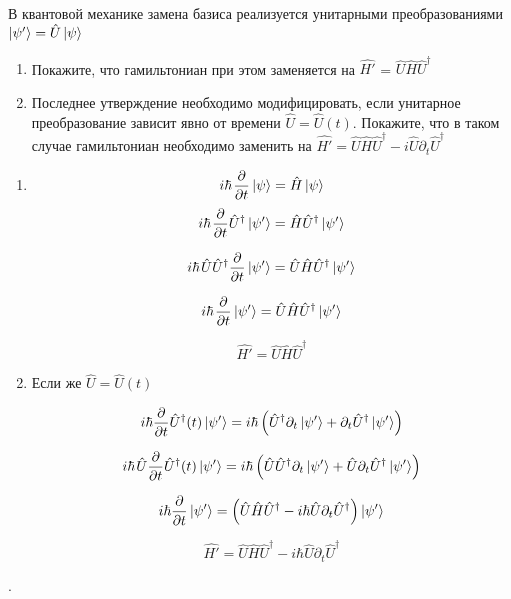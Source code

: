 \begin{exercise}
	В квантовой механике замена базиса реализуется унитарными преобразованиями $\ket{\psi'} = \hat{U}\ket{\psi}$

	\begin{enumerate}
		\item
		Покажите, что гамильтониан при этом заменяется на $\hat{H'}$ = $\hat{U}$$\hat{H}$$\hat{U}^\dagger$
		\item 
		Последнее утверждение необходимо модифицировать, если унитарное преобразование зависит явно от времени $\hat{U}=\hat{U}(t)$. Покажите, что в таком случае гамильтониан необходимо заменить на $\hat{H'} = \hat{U}\hat{H}\hat{U}^\dagger  - i\hat{U} \partial_t \hat{U}^\dagger$
	\end{enumerate}

	\begin{solution}
		\begin{enumerate}
			\item
		
		$$
		i \hbar \hspace{1pt} \frac{\partial }{\partial t} \ket{\psi} = \hat{H} \ket{\psi}
		$$
		$$
		i \hbar \hspace{1pt} \frac{\partial }{\partial t} \hat{U}^\dagger \ket{\psi'} = \hat{H} \hat{U}^\dagger \ket{\psi'}
		$$
		
		$$
		i \hbar \hspace{1pt} \hat{U} \hat{U}^\dagger \frac{\partial }{\partial t}  \ket{\psi'} = \hat{U} \hat{H} \hat{U}^\dagger \ket{\psi'}
		$$
		
		$$
		i \hbar \hspace{1pt} \frac{\partial }{\partial t}  \ket{\psi'} = \hat{U} \hat{H} \hat{U}^\dagger \ket{\psi'}
		$$
		
		$$
		\hat{H'} = \hat{U} \hat{H} \hat{U}^\dagger
		$$
		\item 
		
		Если же $\hat{U}=\hat{U}(t)$
		
		$$
		i \hbar \frac{\partial}{\partial t} \hat{U}^\dagger(t) \ket{\psi'} =i\hbar\left(\hat{U}^\dagger \partial_t \ket{\psi'} + \partial_t \hat{U}^\dagger \ket{\psi'}\right)
		$$
		
		$$
		i \hbar \hspace{1pt}  \hat{U} \frac{\partial}{\partial t} \hat{U}^\dagger(t) \ket{\psi'} =i\hbar\left(\hat{U}\hat{U}^\dagger \partial_t \ket{\psi'} + \hat{U} \partial_t \hat{U}^\dagger \ket{\psi'}\right)
		$$
		
		$$
		i \hbar \frac{\partial}{\partial t} \ket{\psi'} = \left(\hat{U}\hat{H}\hat{U}^\dagger  - i \hbar\hat{U} \partial_t \hat{U}^\dagger\right) \ket{\psi'}
		$$
		
		$$\hat{H'} = \hat{U}\hat{H}\hat{U}^\dagger  - i \hbar \hat{U} \partial_t \hat{U}^\dagger$$
		
			
		\end{enumerate}
	\end{solution}
	.
	
\end{exercise}